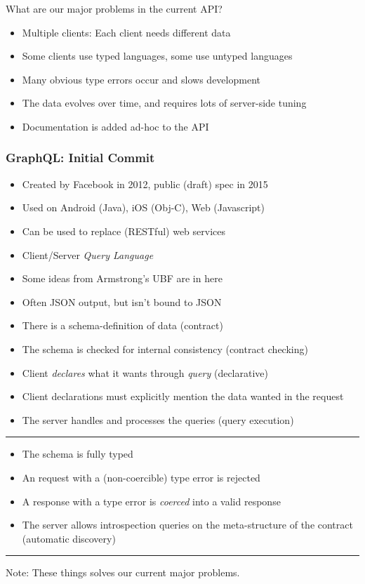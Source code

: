 \documentclass[lualatex]{beamer}
\begin{document}
\begin{frame}
  What are our major problems in the current API?
  \begin{itemize}
  \item Multiple clients: Each client needs different data
  \item Some clients use typed languages, some use untyped languages
  \item Many obvious type errors occur and slows development
  \item The data evolves over time, and requires lots of server-side
    tuning
  \item Documentation is added ad-hoc to the API
  \end{itemize}
\end{frame}

\begin{frame}
  \frametitle{GraphQL: Initial Commit}
  \begin{itemize}
  \item Created by Facebook in 2012, public (draft) spec in 2015
  \item Used on Android (Java), iOS (Obj-C), Web (Javascript)
  \item Can be used to replace (RESTful) web services
  \item Client/Server \emph{Query Language}
  \item Some ideas from Armstrong's UBF are in here
  \item Often JSON output, but isn't bound to JSON
  \end{itemize}
\end{frame}

\begin{frame}
  \begin{itemize}
  \item There is a schema-definition of data (contract)
  \item The schema is checked for internal consistency (contract checking)
  \item Client \emph{declares} what it wants through \emph{query}
    (declarative)
  \item Client declarations must explicitly mention the data wanted in
    the request
  \item The server handles and processes the queries (query execution)
  \end{itemize}
  \rule{\textwidth}{1pt}
\end{frame}

\begin{frame}
  \begin{itemize}
  \item The schema is fully typed
  \item An request with a (non-coercible) type error is rejected
  \item A response with a type error is \emph{coerced} into a valid
    response
  \item The server allows introspection queries on the meta-structure
    of the contract (automatic discovery)
  \end{itemize}
  \rule{\textwidth}{1pt}
  Note: These things solves our current major problems.
\end{frame}
\end{document}
